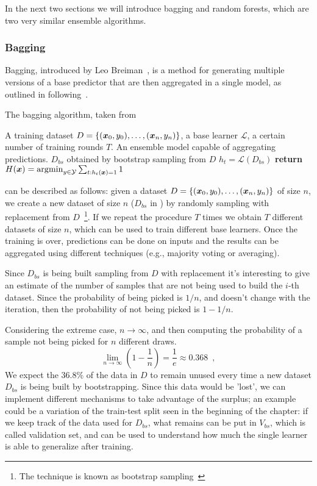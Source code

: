 In the next two sections we will introduce bagging and random forests, which are two very similar
ensemble algorithms.

\subsubsection{Bagging}

Bagging, introduced by Leo Breiman~\cite{Breiman1996}, is a method for generating multiple
versions of a base predictor that are then aggregated in a single model, as outlined in
 following~\cite{ZhouZhi-Hua2021ML, Bauer1999}.
\begin{algorithm}
	\caption{The bagging algorithm, taken from~\cite{Bauer1999}}\label{algo:bagging}
	\begin{algorithmic}[1]
		\Require A training dataset $D = \{(\boldsymbol{x}_0, y_0), \allowbreak\ldots\allowbreak, (\boldsymbol{x}_n, y_n)\}$, a base learner $\mathcal{L}$, a certain number
		of training rounds $T$.
		\Ensure An ensemble model capable of aggregating predictions.
		\State $D_{bs}$ obtained by bootstrap sampling from $D$
		\State $h_t = \mathcal{L}(D_{bs})$ 
		\EndFor
		\State \textbf{return} $H(\boldsymbol{x}) = \operatorname*{\arg\!\min}_{y \in \mathcal{Y}}\sum_{t : h_t(\boldsymbol{x}) =
		1} 1$
		\EndFunction
	\end{algorithmic}
\end{algorithm}

 can be described as follows: given a dataset $D = \{(\boldsymbol{x}_0, y_0), \allowbreak\ldots\allowbreak, (\boldsymbol{x}_n, y_n)\}$ of size $n$, we create a new
dataset of size $n$ ($D_{bs}$ in ) by randomly sampling with replacement from
$D$~\footnote{The technique is known as bootstrap sampling~\cite{ZhouZhi-Hua2021ML}}. If we repeat
the procedure $T$ times we obtain $T$ different datasets of size $n$, which can be used to train
different base learners. Once the training is over, predictions can be done on inputs and the
results can be aggregated using different techniques (e.g., majority voting or averaging).

Since $D_{bs}$ is being built sampling from $D$ with replacement it's interesting to give an
estimate of the number of samples that are not being used to build the $i$-th dataset. Since the
probability of being picked is $1 / n$, and doesn't change with the iteration, then the probability of not being picked is $1 - 1 / n$.

Considering the extreme case, $n \rightarrow \infty$, and then computing the probability of a sample
not being picked for $n$ different draws. \begin{equation}
	\label{eq:bagging-limit}
	\lim_{n \rightarrow \infty} \left(1 - \frac{1}{n}\right) = \frac{1}{e} \approx 0.368
	\enspace,
\end{equation}
We expect the $36.8\%$ of the data in $D$ to remain unused every time a new dataset $D_{bs}$ is
being built by bootstrapping. Since this data would be 'lost', we can implement different mechanisms
to take advantage of the surplus; an example could be a variation of the train-test split seen in the beginning of the chapter: if we keep track of the data used for $D_{bs}$, what remains can be put in $V_{bs}$, which is called validation set, and can be used to understand how much the single learner is able to generalize after training.

